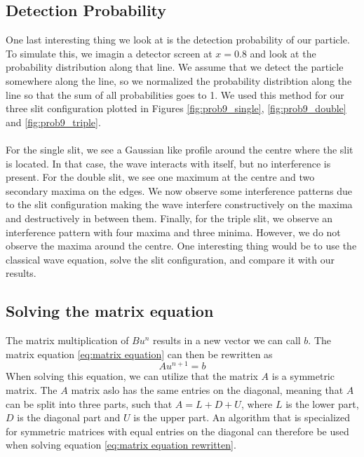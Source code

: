 \documentclass[english,notitlepage,reprint,nofootinbib]{revtex4-2}  %
\begin{document}
	\subsection{Detection Probability} \label{subsec:detec_prob}
	\noindent
	One last interesting thing we look at is the detection probability of our particle.
	To simulate this, we imagin a detector screen at $x=0.8$ and look at the probability
	distribution along that line. We assume that we detect the particle somewhere along the line, so we normalized the probability distribtion along the line so that the sum of all probabilities goes to 1. We used this method
	for our three slit configuration plotted in Figures \ref{fig:prob9_single}, \ref{fig:prob9_double}
	and \ref{fig:prob9_triple}. \\
	\noindent \\
	For the single slit, we see a Gaussian like profile around the centre where the slit
	is located. In that case, the wave interacts with itself, but no interference is present.	For the
	double slit, we see one maximum at the centre and two secondary maxima on the edges. We now observe some interference patterns due to the slit configuration making the wave interfere constructively on the maxima and destructively in between them. Finally, for
	the triple slit, we observe an interference pattern with four maxima and three
	minima. However, we do not observe the maxima around the centre. One interesting thing would be to use the classical wave equation, solve the slit configuration, and compare it with our results.
	\subsection{Solving the matrix equation}
	\noindent
	The matrix multiplication of $Bu^n$ results in a new vector we can call $b$.
	The matrix equation \ref{eq:matrix equation} can then be rewritten as
	\begin{equation}\label{eq:matrix equation rewritten}
		Au^{n+1} = b
	\end{equation}
	When solving this equation, we can utilize that the matrix $A$ is a symmetric matrix. The $A$ matrix aslo has
	the same entries on the diagonal, meaning that $A$ can be split into three parts, such that $A = L+ D + U$, where $L$ is the lower part,
	$D$ is the diagonal part and $U$ is the upper part.  
	An algorithm that is specialized for symmetric matrices with equal entries on the diagonal can therefore be 
	used when solving equation \ref{eq:matrix equation rewritten}.   
\end{document}

